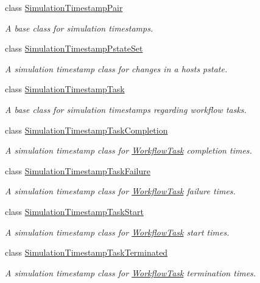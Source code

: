 \begin{DoxyCompactItemize}
class \hyperlink{classwrench_1_1_simulation_timestamp_pair}{Simulation\+Timestamp\+Pair}
\begin{DoxyCompactList}\small\item\em A base class for simulation timestamps. \end{DoxyCompactList}\item 
class \hyperlink{classwrench_1_1_simulation_timestamp_pstate_set}{Simulation\+Timestamp\+Pstate\+Set}
\begin{DoxyCompactList}\small\item\em A simulation timestamp class for changes in a host\textquotesingle{}s pstate. \end{DoxyCompactList}\item 
class \hyperlink{classwrench_1_1_simulation_timestamp_task}{Simulation\+Timestamp\+Task}
\begin{DoxyCompactList}\small\item\em A base class for simulation timestamps regarding workflow tasks. \end{DoxyCompactList}\item 
class \hyperlink{classwrench_1_1_simulation_timestamp_task_completion}{Simulation\+Timestamp\+Task\+Completion}
\begin{DoxyCompactList}\small\item\em A simulation timestamp class for \hyperlink{classwrench_1_1_workflow_task}{Workflow\+Task} completion times. \end{DoxyCompactList}\item 
class \hyperlink{classwrench_1_1_simulation_timestamp_task_failure}{Simulation\+Timestamp\+Task\+Failure}
\begin{DoxyCompactList}\small\item\em A simulation timestamp class for \hyperlink{classwrench_1_1_workflow_task}{Workflow\+Task} failure times. \end{DoxyCompactList}\item 
class \hyperlink{classwrench_1_1_simulation_timestamp_task_start}{Simulation\+Timestamp\+Task\+Start}
\begin{DoxyCompactList}\small\item\em A simulation timestamp class for \hyperlink{classwrench_1_1_workflow_task}{Workflow\+Task} start times. \end{DoxyCompactList}\item 
class \hyperlink{classwrench_1_1_simulation_timestamp_task_terminated}{Simulation\+Timestamp\+Task\+Terminated}
\begin{DoxyCompactList}\small\item\em A simulation timestamp class for \hyperlink{classwrench_1_1_workflow_task}{Workflow\+Task} termination times. \end{DoxyCompactList}\item 

\end{DoxyCompactItemize}
